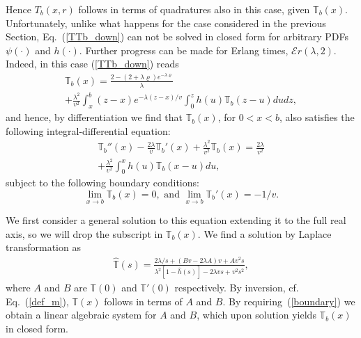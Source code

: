 \documentclass[english,aps,a4paper,twocolumn,showpacs,showkeys,amsfonts,amsmath,amssymb,amscd,nofootinbib]{revtex4}
\newcommand{\1}{\'\i}
\newcommand{\TT}{\mathbb{T}}\newcommand{\FF}{\mathbb{F}}
\begin{document}
 Hence
 $T_b(x,r)$ follows in terms of quadratures also in this case,  given $\TT_b(x)$.
  Unfortunately, unlike  what happens   for  the case    considered in the previous Section,
  Eq.~(\ref{TTb_down})   can not be  solved in  closed form
   for   arbitrary PDFs $\psi(\cdot)$ and
$h(\cdot)$.    Further progress can be made for Erlang times, $\mathcal Er(\lambda,2)$. %
Indeed, in this case (\ref{TTb_down}) reads
\begin{eqnarray}
\TT_b(x)= \frac{2-\left(2+\lambda \varrho\right)e^{-\lambda
\varrho}}{\lambda} \nonumber \\+\frac{\lambda^2}{v^2} \int^{b}_{x}
\left(z-x\right)e^{-\lambda \left(z-x\right)/v} \int^{z}_{0} h(u)
\TT_b\left(z-u\right)d  ud  z,
\end{eqnarray}
 and hence, by differentiation we find that
$ \TT_b(x)$, for $0< x< b$,  also satisfies the following
integral-differential equation:
\begin{eqnarray}
\TT_b''(x)-\frac{2\lambda}{v}\TT_b'(x)+\frac{\lambda^2}{v^2}\TT_b(x)=
\frac{2\lambda}{v^2} \nonumber \\+\frac{\lambda^2}{v^2}\int^{x}_{0}h(u) \TT_b\left(x-u\right)d  u, 
\label{IDb_down}
\end{eqnarray}
subject to the following boundary conditions: 
\begin{equation}
\lim_{x\to b}\TT_b(x)=0,\mbox{ and }\lim_{x\to b}\TT_b'(x)=-1/v.
\label{boundary}
\end{equation}



We first consider a general solution to this equation extending
it   to the full  real axis, so we will drop the subscript in $\TT_b(x)$.
    We find a solution by Laplace transformation as
\begin{eqnarray}
\hat{ \TT }(s)= \frac{2\lambda/s +   (B v-2 \lambda A)v  + A
v^2s}{\lambda^2[1-\hat{h}(s)]-2\lambda v s+ v^2s^2},
\end{eqnarray}
where   $A $ and  $B$ are %
$\TT(0)$ and $\TT'(0)$ respectively. By
inversion, cf. Eq.~(\ref{def_m}), $\TT(x)$ follows in terms of
$A$ and $B$. By requiring~(\ref{boundary}) %
we obtain a linear algebraic system for $A$ and $B$,
which upon solution yields $\TT_b(x)$ in closed form.
\end{document}
